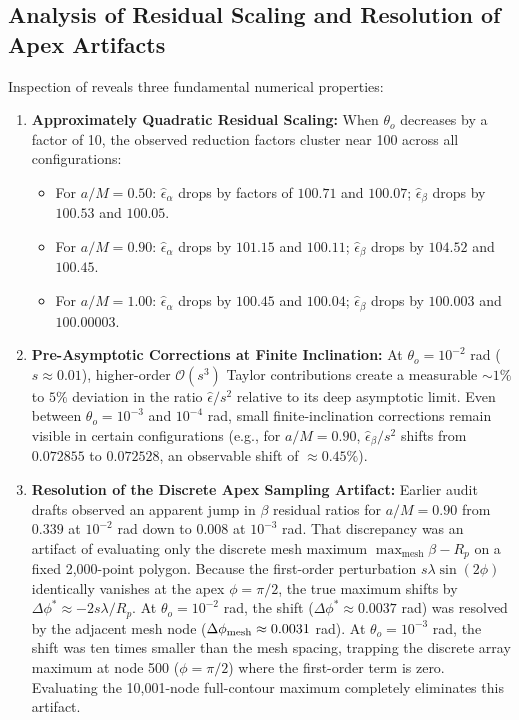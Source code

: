 \subsection{Analysis of Residual Scaling and Resolution of Apex Artifacts}
Inspection of  reveals three fundamental numerical properties:
\begin{enumerate}
    \item \textbf{Approximately Quadratic Residual Scaling:} When $\theta_o$ decreases by a factor of 10, the observed reduction factors cluster near 100 across all configurations:
    \begin{itemize}
        \item For $a/M = 0.50$: $\hat{\epsilon}_\alpha$ drops by factors of $100.71$ and $100.07$; $\hat{\epsilon}_\beta$ drops by $100.53$ and $100.05$.
        \item For $a/M = 0.90$: $\hat{\epsilon}_\alpha$ drops by $101.15$ and $100.11$; $\hat{\epsilon}_\beta$ drops by $104.52$ and $100.45$.
        \item For $a/M = 1.00$: $\hat{\epsilon}_\alpha$ drops by $100.45$ and $100.04$; $\hat{\epsilon}_\beta$ drops by $100.003$ and $100.00003$.
    \end{itemize}
    \item \textbf{Pre-Asymptotic Corrections at Finite Inclination:} At $\theta_o = 10^{-2}$ rad ($s \approx 0.01$), higher-order $\mathcal{O}(s^3)$ Taylor contributions create a measurable $\sim 1\%$ to $5\%$ deviation in the ratio $\hat{\epsilon}/s^2$ relative to its deep asymptotic limit. Even between $\theta_o = 10^{-3}$ and $10^{-4}$ rad, small finite-inclination corrections remain visible in certain configurations (e.g., for $a/M = 0.90$, $\hat{\epsilon}_\beta/s^2$ shifts from $0.072855$ to $0.072528$, an observable shift of $\approx 0.45\%$).
    \item \textbf{Resolution of the Discrete Apex Sampling Artifact:} Earlier audit drafts observed an apparent jump in $\beta$ residual ratios for $a/M = 0.90$ from $0.339$ at $10^{-2}$ rad down to $0.008$ at $10^{-3}$ rad. That discrepancy was an artifact of evaluating only the discrete mesh maximum $\max_{\text{mesh}} \beta - R_p$ on a fixed 2,000-point polygon. Because the first-order perturbation $s\lambda\sin(2\phi)$ identically vanishes at the apex $\phi = \pi/2$, the true maximum shifts by $\Delta\phi^* \approx -2s\lambda/R_p$. At $\theta_o = 10^{-2}$ rad, the shift ($\Delta\phi^* \approx 0.0037$ rad) was resolved by the adjacent mesh node ($\Delta\phi_{\rm mesh} \approx 0.0031$ rad). At $\theta_o = 10^{-3}$ rad, the shift was ten times smaller than the mesh spacing, trapping the discrete array maximum at node 500 ($\phi = \pi/2$) where the first-order term is zero. Evaluating the 10,001-node full-contour maximum completely eliminates this artifact.
\end{enumerate}

